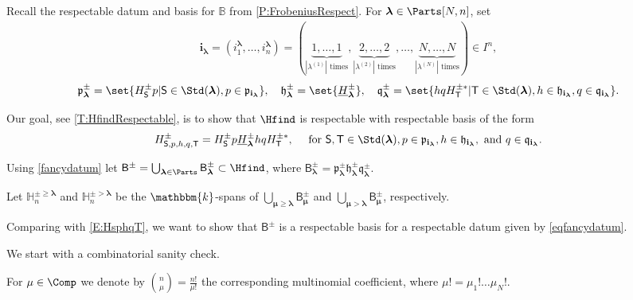 \documentclass[a4paper,11pt]{amsart}
\newcommand\blam{{\boldsymbol\lambda}}
\newcommand\bmu{{\boldsymbol\mu}}
\newcommand\bi{\mathbf{i}}
\newcommand\ilam[1][\blam]{\bi_{#1}}
\numberwithin{equation}{subsection}
\theoremstyle{definition}
\theoremstyle{theorem}
\theoremstyle{remark}
\newcommand\plam[1][\lambda]{\mathfrak{p}_{#1}}
\newcommand\hlam[1][\lambda]{\mathfrak{h}_{#1}}
\newcommand\qlam[1][\lambda]{\mathfrak{q}_{#1}}
\newcommand\HH{\mathbb{H}}
\newcommand\HJpm{\underline{H}^\pm}
\newcommand\Basis[1][\pm]{\mathsf{B}^{#1}}
\newcommand\bS{{\mathsf{S}}}
\newcommand\bT{{\mathsf{T}}}
\newcommand\kk{\mathbbm{k}}
\newcommand{\Bo}{\mathbb{B}}
\begin{document}
\begin{Definition}\label{fancydatum}
Recall the respectable datum and basis for $\Bo$ from \autoref{P:FrobeniusRespect}.
 For $\blam\in\Parts[N,n]$, set
\begin{equation}\label{eqfancydatum}
\begin{gathered}
   \ilam = (i^\blam_1,\dots,i^\blam_n)=(
         \underbrace{1,\dots,1}_{|\lambda^{(1)}|\text{ times}},
         \underbrace{2,\dots,2}_{|\lambda^{(2)}|\text{ times}},
         \dots,
         \underbrace{N,\dots,N}_{|\lambda^{(N)}|\text{ times}}
   )\in I^n,
\end{gathered}
\end{equation}
\[
\plam[\blam]^\pm=\set{ H^\pm_\bS p|\bS\in \Std(\blam), p\in\plam[\ilam]},
\quad\hlam[\blam]^\pm=\set{\HJpm_\blam},
\quad\qlam[\blam]^\pm=\set{hqH^{\pm*}_\bT|\bT\in \Std(\blam), h\in\hlam[\ilam], q\in\qlam[\ilam]}.
\]
\end{Definition}
Our goal, see
\autoref{T:HfindRespectable}, is to show that $\Hfind$ is respectable with respectable basis of the form
\begin{equation}\label{E:HsphqT}
  H^\pm_{\bS,p,h,q,\bT}= H^\pm_\bS p\HJpm_\blam hqH^{\pm*}_\bT,
      \quad\text{ for } \bS,\bT\in\Std(\blam),
      p\in\plam[\ilam], h\in\hlam[\ilam], \text{ and } q\in\qlam[\ilam].
\end{equation}

 \begin{Definition}\label{fancyB}
Using  \autoref{fancydatum} let $\Basis=\bigcup_{\blam\in\Parts}\Basis_\blam\subset \Hfind$, where
$\Basis_\blam=\plam[\blam]^\pm\hlam[\blam]^\pm\qlam[\blam]^\pm$.

Let $\HH^{\pm\ge\blam}_n$ and
 $\HH^{\pm>\blam}_n$ be the $\kk$-spans of $\bigcup_{\bmu\ge\blam}\Basis_\bmu$ and
 $\bigcup_{\bmu>\blam}\Basis_\bmu$, respectively.
 \end{Definition}

Comparing with \autoref{E:HsphqT}, we want to show that $\Basis$ is a respectable basis for a respectable datum given by \autoref{eqfancydatum}.

We start with a combinatorial sanity check.

For $\mu\in\Comp$ we denote by $\binom n\mu=\tfrac{n!}{\mu!}$ the
corresponding multinomial coefficient, where $\mu!=\mu_1!\dots\mu_N!$.
\end{document}
